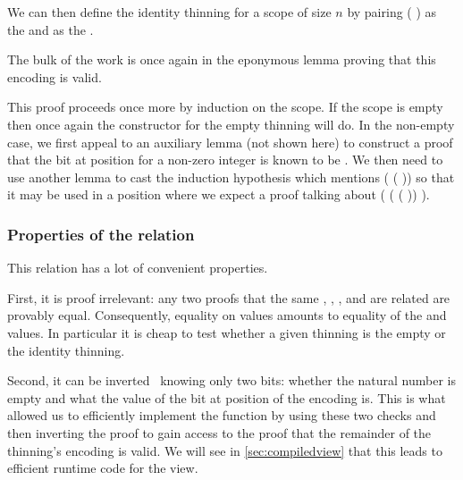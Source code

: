 \noindent
\begin{minipage}{.45\textwidth}
\end{minipage}\hfill
\begin{minipage}{.45\textwidth}
\end{minipage}

We can then define the identity thinning for a scope of size $n$ by pairing
( ) as the
 and 
as the .


The bulk of the work is once again in the eponymous lemma proving that this
encoding is valid.



This proof proceeds once more by induction on the scope.
%
If the scope is empty then once again the constructor for the empty thinning will do.
%
In the non-empty case, we first appeal to an auxiliary lemma (not shown here) to
construct a proof  that the bit at position  for a
non-zero  integer is known to be .
%
We then need to use another lemma to cast the induction hypothesis which mentions
( ( )) so that it may be
used in a position where we expect a proof talking about
( ( ( \IdrisData{:<} ))
 ).

\subsubsection{Properties of the  relation}

This relation has a lot of convenient properties.

First, it is proof irrelevant: any two proofs that the same
, , , and  are
related are provably equal.
%
Consequently, equality on  values amounts to equality of
the  and  values. In particular
it is cheap to test whether a given thinning is the empty or the
identity thinning.

Second, it can be inverted~\cite{DBLP:conf/types/CornesT95} knowing only two bits:
whether the natural number is empty and what the value of the bit at position
 of the encoding is.
%
This is what allowed us to efficiently implement the  function
by using
these two checks and then inverting the  proof to gain access
to the proof that the remainder of the thinning's encoding is valid.
%
We will see in \cref{sec:compiledview} that this leads to efficient runtime code for the view.

